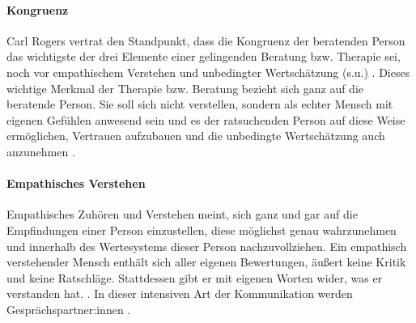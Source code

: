 \documentclass[
  twoside,
  parskip=half-,
]{scrreprt}
\begin{document}
\paragraph{Kongruenz} Carl Rogers vertrat den Standpunkt, dass die Kongruenz der beratenden Person das wichtigste der drei Elemente einer gelingenden Beratung bzw. Therapie sei, noch vor empathischem Verstehen und unbedingter Wertschätzung (s.u.) \autocite[vgl.][162]{rogers1977}.
 Dieses wichtige Merkmal der Therapie bzw. Beratung bezieht sich ganz auf die beratende Person. Sie soll sich nicht verstellen, sondern als echter Mensch mit eigenen Gefühlen anwesend sein und es der ratsuchenden Person auf diese Weise ermöglichen, Vertrauen aufzubauen und die unbedingte Wertschätzung auch anzunehmen \autocite[vgl.][151]{rogers1977}.

\paragraph{Empathisches Verstehen} Empathisches Zuhören und Verstehen meint, sich ganz und gar auf die Empfindungen einer Person einzustellen, diese möglichst genau wahrzunehmen und innerhalb des Wertesystems dieser Person nachzuvollziehen. Ein empathisch verstehender Mensch enthält sich aller eigenen Bewertungen, äußert keine Kritik und keine Ratschläge. Stattdessen gibt er mit eigenen Worten wider, was er verstanden hat. . In dieser intensiven Art der Kommunikation werden Gesprächspartner:innen .
\end{document}
